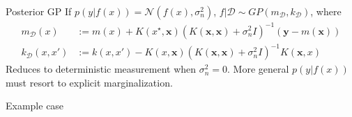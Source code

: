 \documentclass{beamer}
\begin{document}
\begin{frame}{}
\begin{block}{Posterior GP}
If $p(y|f(x)) = \mathcal{N}(f(x),\sigma_n^2)$, $f|\mathcal{D} \sim GP(m_\mathcal{D},k_\mathcal{D})$, where 
\begin{equation*}
\begin{split}
m_\mathcal{D}(x) & := m(x) + K(x^\star,\mathbf{x}) (K(\mathbf{x},\mathbf{x})+\sigma^2_n I)^{-1} (\mathbf{y} - m(\mathbf{x})) \\
k_\mathcal{D}(x,x') & := k(x,x') - K(x,\mathbf{x})(K(\mathbf{x},\mathbf{x})+\sigma_n^2 I)^{-1}K(\mathbf{x},x)
\end{split}
\end{equation*}
Reduces to deterministic measurement when $\sigma_n^2 = 0$. More general $p(y|f(x))$ must resort to explicit marginalization.
\end{block}
\end{frame}

\begin{frame}{}
\begin{block}{Example case}


\begin{figure}
\centering
\captionsetup[subfigure]{labelformat=empty}

\end{figure}

\end{block}
\end{frame}
\end{document}
